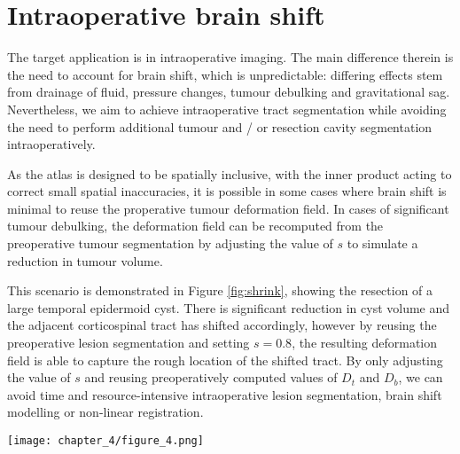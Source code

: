 



\section{Intraoperative brain shift}


The target application is in intraoperative imaging.
The main difference therein is the need to account for brain shift, which is unpredictable: differing effects stem from drainage of fluid, pressure changes, tumour debulking and gravitational sag.
Nevertheless, we aim to achieve intraoperative tract segmentation while avoiding the need to perform additional tumour and / or resection cavity segmentation intraoperatively.

As the atlas is designed to be spatially inclusive, with the inner product acting to correct small spatial inaccuracies, it is possible in some cases where brain shift is minimal to reuse the properative tumour deformation field.
In cases of significant tumour debulking, the deformation field can be recomputed from the preoperative tumour segmentation by adjusting the value of $s$ to simulate a reduction in tumour volume.

This scenario is demonstrated in Figure \ref{fig:shrink}, showing the resection of a large temporal epidermoid cyst. There is significant reduction in cyst volume and the adjacent corticospinal tract has shifted accordingly, however by reusing the preoperative lesion segmentation and setting $s=0.8$, the resulting deformation field is able to capture the rough location of the shifted tract. By only adjusting the value of $s$ and reusing preoperatively computed values of $D_t$ and $D_b$, we can avoid time and resource-intensive intraoperative lesion segmentation, brain shift modelling or non-linear registration.

\begin{figure*}[h!]
  \centering
  \texttt{[image: chapter\_4/figure\_4.png]}
  \caption{Example results in intraoperative image using scaled preoperative tumour segmentation. Blue outline: Tumour segmentation. Green outline: effective tumour boundary with $s=0.8$ used for intraoperative segmentation}
  \label{fig:shrink}
\end{figure*}

